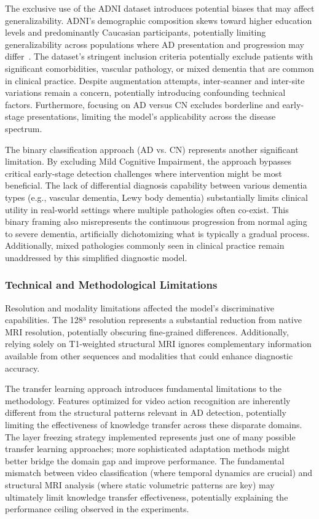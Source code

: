 \documentclass[11pt, a4paper]{article}
\begin{document}
The exclusive use of the ADNI dataset introduces potential biases that may affect generalizability. ADNI's demographic composition skews toward higher education levels and predominantly Caucasian participants, potentially limiting generalizability across populations where AD presentation and progression may differ~\cite{jack2008alzheimer}. The dataset's stringent inclusion criteria potentially exclude patients with significant comorbidities, vascular pathology, or mixed dementia that are common in clinical practice. Despite augmentation attempts, inter-scanner and inter-site variations remain a concern, potentially introducing confounding technical factors. Furthermore, focusing on AD versus CN excludes borderline and early-stage presentations, limiting the model's applicability across the disease spectrum.

The binary classification approach (AD vs. CN) represents another significant limitation. By excluding Mild Cognitive Impairment, the approach bypasses critical early-stage detection challenges where intervention might be most beneficial. The lack of differential diagnosis capability between various dementia types (e.g., vascular dementia, Lewy body dementia) substantially limits clinical utility in real-world settings where multiple pathologies often co-exist. This binary framing also misrepresents the continuous progression from normal aging to severe dementia, artificially dichotomizing what is typically a gradual process. Additionally, mixed pathologies commonly seen in clinical practice remain unaddressed by this simplified diagnostic model.

\subsubsection{Technical and Methodological Limitations}

Resolution and modality limitations affected the model's discriminative capabilities. The 128³ resolution represents a substantial reduction from native MRI resolution, potentially obscuring fine-grained differences. Additionally, relying solely on T1-weighted structural MRI ignores complementary information available from other sequences and modalities that could enhance diagnostic accuracy.

The transfer learning approach introduces fundamental limitations to the methodology. Features optimized for video action recognition are inherently different from the structural patterns relevant in AD detection, potentially limiting the effectiveness of knowledge transfer across these disparate domains. The layer freezing strategy implemented represents just one of many possible transfer learning approaches; more sophisticated adaptation methods might better bridge the domain gap and improve performance. The fundamental mismatch between video classification (where temporal dynamics are crucial) and structural MRI analysis (where static volumetric patterns are key) may ultimately limit knowledge transfer effectiveness, potentially explaining the performance ceiling observed in the experiments.
\end{document}
